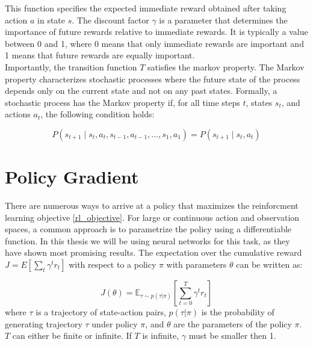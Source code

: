 This function specifies the expected immediate reward obtained after taking action $a$ in state $s$. The discount factor $\gamma$ is a 
parameter that determines the importance of future rewards relative to immediate rewards. It is typically a value between 0 and 1, where 0 means that 
only immediate rewards are important and 1 means that future rewards are equally important. \\

Importantly, the transition function $T$ satisfies the markov property. The Markov property characterizes stochastic processes where the future state of the 
process depends only on the current state and not on any past states. Formally, a stochastic process has the Markov property if, 
for all time steps $t$, states $s_t$, and actions $a_t$, the following condition holds:

\begin{equation}
    P(s_{t+1} \mid s_t, a_t, s_{t-1}, a_{t-1}, \ldots, s_1, a_1) = P(s_{t+1} \mid s_t, a_t)
\end{equation}

\section{Policy Gradient}
There are numerous ways to arrive at a policy that maximizes the reinforcment learning objective \ref{rl_objective}. For large or continuous action and observation spaces, a common approach is 
to parametrize the policy using a differentiable function. In this thesis we will be using neural networks for this task, as they have shown most promising results. The expectation over the cumulative 
reward $J = E[\sum_{t} \gamma^t r_t]$ with respect to a policy $\pi$ with parameters $\theta$ can be written as:

\begin{equation}
J(\theta) = \mathbb{E}_{\tau \sim p(\tau | \pi)} \left[ \sum_{t=0}^T \gamma^t r_t \right]
\end{equation}
where $\tau$ is a trajectory of state-action pairs, $p(\tau | \pi)$ is the probability of generating trajectory $\tau$ under policy $\pi$, and $\theta$ are the parameters of the policy $\pi$. 
$T$ can either be finite or infinite. If $T$ is infinite, $\gamma$ must be smaller then 1.

